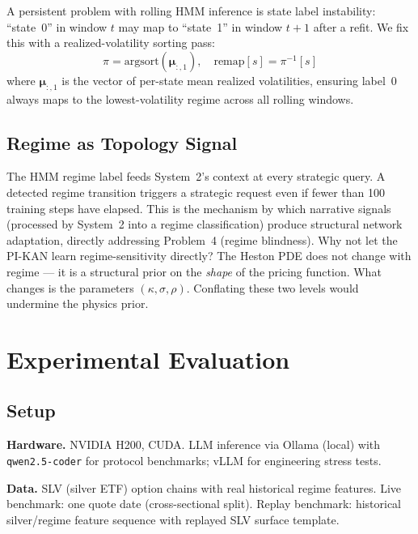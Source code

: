 \documentclass[11pt,a4paper]{article}
\begin{document}
A persistent problem with rolling HMM inference is state label instability: ``state~0''
in window $t$ may map to ``state~1'' in window $t+1$ after a refit. We fix this with
a realized-volatility sorting pass:
\begin{equation}
\pi = \text{argsort}(\bm{\mu}_{:,1}), \quad \text{remap}[s] = \pi^{-1}[s]
\label{eq:hmm_relabel}
\end{equation}
where $\bm{\mu}_{:,1}$ is the vector of per-state mean realized volatilities, ensuring
label~0 always maps to the lowest-volatility regime across all rolling windows.

\subsection{Regime as Topology Signal}
\label{sec:regime:signal}

The HMM regime label feeds System~2's context at every strategic query. A detected
regime transition triggers a strategic request even if fewer than 100 training steps
have elapsed. This is the mechanism by which narrative signals (processed by System~2
into a regime classification) produce structural network adaptation, directly addressing
Problem~4 (regime blindness). Why not let the PI-KAN learn regime-sensitivity directly?
The Heston PDE does not change with regime --- it is a structural prior on the
\emph{shape} of the pricing function. What changes is the parameters
$(\kappa, \sigma, \rho)$. Conflating these two levels would undermine the physics prior.

\section{Experimental Evaluation}
\label{sec:experiments}

\subsection{Setup}
\label{sec:experiments:setup}

\textbf{Hardware.} NVIDIA H200, CUDA. LLM inference via Ollama (local) with
\texttt{qwen2.5-coder} for protocol benchmarks; vLLM for engineering stress tests.

\textbf{Data.} SLV (silver ETF) option chains with real historical regime features.
Live benchmark: one quote date (cross-sectional split). Replay benchmark: historical
silver/regime feature sequence with replayed SLV surface template.
\end{document}
